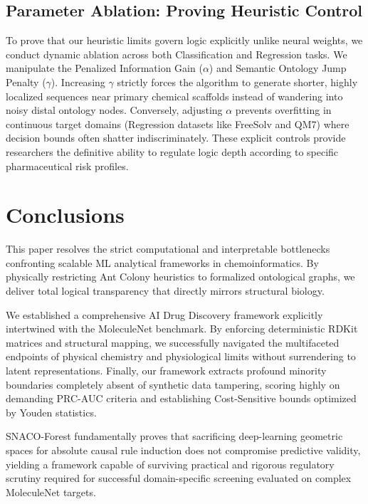 \documentclass[preprint,12pt,authoryear]{elsarticle}
\begin{document}
\subsection{Parameter Ablation: Proving Heuristic Control}
To prove that our heuristic limits govern logic explicitly unlike neural weights, we conduct dynamic ablation across both Classification and Regression tasks. We manipulate the Penalized Information Gain ($\alpha$) and Semantic Ontology Jump Penalty ($\gamma$).
Increasing $\gamma$ strictly forces the algorithm to generate shorter, highly localized sequences near primary chemical scaffolds instead of wandering into noisy distal ontology nodes. Conversely, adjusting $\alpha$ prevents overfitting in continuous target domains (Regression datasets like FreeSolv and QM7) where decision bounds often shatter indiscriminately. These explicit controls provide researchers the definitive ability to regulate logic depth according to specific pharmaceutical risk profiles.

\section{Conclusions}
\label{sec:conclusion}

This paper resolves the strict computational and interpretable bottlenecks confronting scalable ML analytical frameworks in chemoinformatics. By physically restricting Ant Colony heuristics to formalized ontological graphs, we deliver total logical transparency that directly mirrors structural biology. 

We established a comprehensive AI Drug Discovery framework explicitly intertwined with the MoleculeNet benchmark. By enforcing deterministic RDKit matrices and structural mapping, we successfully navigated the multifaceted endpoints of physical chemistry and physiological limits without surrendering to latent representations. Finally, our framework extracts profound minority boundaries completely absent of synthetic data tampering, scoring highly on demanding PRC-AUC criteria and establishing Cost-Sensitive bounds optimized by Youden statistics.

SNACO-Forest fundamentally proves that sacrificing deep-learning geometric spaces for absolute causal rule induction does not compromise predictive validity, yielding a framework capable of surviving practical and rigorous regulatory scrutiny required for successful domain-specific screening evaluated on complex MoleculeNet targets.

\appendix
\end{document}
